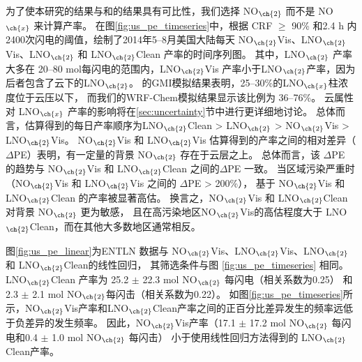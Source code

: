 为了使本研究的结果与\citet{Pickering.2016}和\citet{Lapierre.2020}的结果具有可比性，我们选择 NO$_{\ch{2}}$  而不是 NO$_{\ch{x}}$  来计算产率。
在图\ref{fig:us_pe_timeseries}中，根据 CRF $\geq$ 90\% 和2.4 h 内2400次闪电的阈值，绘制了2014年5--8月美国大陆每天 NO$_{\ch{2}}$Vis、LNO$_{\ch{2}}$Vis、LNO$_{\ch{2}}$ 和 LNO$_{\ch{2}}$Clean 产率的时间序列图。
其中，LNO$_{\ch{2}}$ 产率大多在 20--80 mol每闪电的范围内，LNO$_{\ch{2}}$Vis 产率小于LNO$_{\ch{2}}$产率，因为后者包含了云下的LNO$_{\ch{2}}$。
\citet{Pickering.2016}的GMI模拟结果表明，25--30\%的LNO$_{\ch{x}}$柱浓度位于云压以下，
而我们的WRF-Chem模拟结果显示该比例为 36--76\%。
云属性对 LNO$_{\ch{x}}$ 产率的影响将在\ref{sec:uncertainty}节中进行更详细地讨论。
总体而言，估算得到的每日产率顺序为LNO$_{\ch{2}}$Clean > LNO$_{\ch{2}}$ > NO$_{\ch{2}}$Vis > LNO$_{\ch{2}}$Vis。
NO$_{\ch{2}}$Vis 和 LNO$_{\ch{2}}$Vis 估算得到的产率之间的相对差异（$\Delta$PE）表明，有一定量的背景 NO$_{\ch{2}}$ 存在于云层之上。
总体而言，该 $\Delta$PE 的趋势与 NO$_{\ch{2}}$Vis 和 LNO$_{\ch{2}}$Clean 之间的$\Delta$PE 一致。
当区域污染严重时（NO$_{\ch{2}}$Vis 和 LNO$_{\ch{2}}$Vis 之间的 $\Delta$PE > 200\%），
基于 NO$_{\ch{2}}$Vis 和 LNO$_{\ch{2}}$Clean 的产率被显著高估。
换言之，NO$_{\ch{2}}$Vis 和 LNO$_{\ch{2}}$Clean 对背景 NO$_{\ch{2}}$ 更为敏感，
且在高污染地区NO$_{\ch{2}}$Vis的高估程度大于 LNO$_{\ch{2}}$Clean，而在其他大多数地区通常相反。

图\ref{fig:us_pe_linear}为ENTLN 数据与 NO$_{\ch{2}}$Vis、LNO$_{\ch{2}}$Vis、LNO$_{\ch{2}}$ 和 LNO$_{\ch{2}}$Clean的线性回归，
其筛选条件与图 \ref{fig:us_pe_timeseries} 相同。
LNO$_{\ch{2}}$Clean 产率为 25.2 $\pm$ 22.3 mol NO$_{\ch{2}}$ 每闪电（相关系数为0.25）
和 2.3 $\pm$ 2.1 mol NO$_{\ch{2}}$每闪击（相关系数为0.22）。
如图\ref{fig:us_pe_timeseries}所示，NO$_{\ch{2}}$Vis产率和LNO$_{\ch{2}}$Clean产率之间的正百分比差异发生的频率远低于负差异的发生频率。
因此，NO$_{\ch{2}}$Vis产率（17.1 $\pm$ 17.2 mol NO$_{\ch{2}}$ 每闪电和0.4 $\pm$ 1.0 mol NO$_{\ch{2}}$ 每闪击）
小于使用线性回归方法得到的 LNO$_{\ch{2}}$Clean产率。


